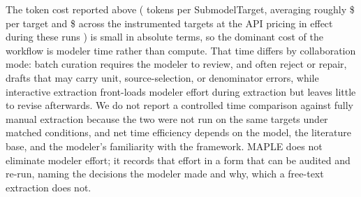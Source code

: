 The token cost reported above (\avgTokens{} tokens per SubmodelTarget, averaging roughly \$\avgCost{} per target and \$\totalCost{} across the \nTargets{} instrumented targets at the API pricing in effect during these runs \citep{OpenAI_API_Pricing_2026}) is small in absolute terms, so the dominant cost of the workflow is modeler time rather than compute. That time differs by collaboration mode: batch curation requires the modeler to review, and often reject or repair, drafts that may carry unit, source-selection, or denominator errors, while interactive extraction front-loads modeler effort during extraction but leaves little to revise afterwards. We do not report a controlled time comparison against fully manual extraction because the two were not run on the same targets under matched conditions, and net time efficiency depends on the model, the literature base, and the modeler's familiarity with the framework. MAPLE does not eliminate modeler effort; it records that effort in a form that can be audited and re-run, naming the decisions the modeler made and why, which a free-text extraction does not.
